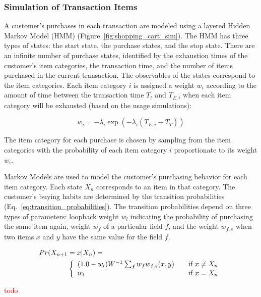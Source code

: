 \documentclass[conference]{IEEEtran}
\begin{document}
\subsubsection{Simulation of Transaction Items} \label{sec:transaction-purchases}

A customer's purchases in each transaction are modeled using a layered Hidden Markov Model (HMM) (Figure~\ref{fig:shopping_cart_sim}).  The HMM has three types of states: the start state, the purchase states, and the stop state. There are an infinite number of purchase states, identified by the exhaustion times of the customer's item categories, the transaction time, and the number of items purchased in the current transaction. The observables of the states correspond to the item categories.  Each item category $i$ is assigned a weight $w_i$ according to the amount of time between the transaction time $T_t$ and $T_{E,i}$ when each item category will be exhausted (based on the usage simulations):

\begin{equation*}
w_i = - \lambda_i \exp(-\lambda_i (T_{E, i}- T_{T}))
\end{equation*}

The item category for each purchase is chosen by sampling from the item categories with the probability of each item category $i$ proportionate to its weight $w_i$.

Markov Models are used to model the customer's purchasing behavior for each item category.  Each state $X_n$ corresponds to an item in that category. The customer's buying habits are determined by the transition probabilities (Eq.~\ref{eq:transition_probabilities}).  The transition probabilities depend on three types of parameters: loopback weight $w_l$ indicating the probability of purchasing the same item again, weight $w_f$ of a particular field $f$, and the weight $w_{f,s}$ when two items $x$ and $y$ have the same value for the field $f$. 

\begin{align} \label{eq:transition_probabilities}
Pr(X_{n+1}&=x|X_n) = \nonumber \\
& \left\{ 
  \begin{array}{l l}
   (1.0 - w_l) W^{-1} \sum_f w_f w_{f,s}(x, y)  & \quad \text{if $x \neq X_n$}\\
   w_l & \quad \text{if $x = X_n$}
  \end{array} \right.
\end{align}

\textcolor{red}{todo}
\end{document}
